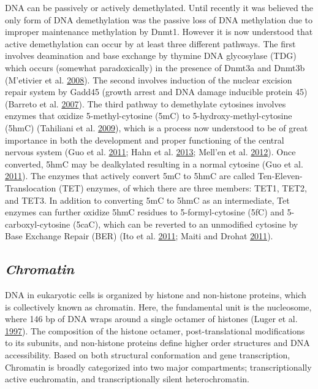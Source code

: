 \documentclass[onehalf,12pt]{beavtex}
\begin{document}
  DNA can be passively or actively demethylated. Until recently it was
  believed the only form of DNA demethylation was the passive loss of DNA
  methylation due to improper maintenance methylation by Dnmt1. However it
  is now understood that active demethylation can occur by at least three
  different pathways. The first involves deamination and base exchange by
  thymine DNA glycosylase (TDG) which occurs (somewhat paradoxically) in
  the presence of Dnmt3a and Dnmt3b (M\a'etivier et al.
  \protect\hyperlink{ref-MetivierCyclicalDNAmethylation2008}{2008}). The
  second involves induction of the nuclear excision repair system by
  Gadd45 (growth arrest and DNA damage inducible protein 45) (Barreto et
  al. \protect\hyperlink{ref-BarretoGadd45apromotesepigenetic2007}{2007}).
  The third pathway to demethylate cytosines involves enzymes that oxidize
  5-methyl-cytosine (5mC) to 5-hydroxy-methyl-cytosine (5hmC) (Tahiliani
  et al.
  \protect\hyperlink{ref-TahilianiConversion5methylcytosine5hydroxymethylcytosine2009}{2009}),
  which is a process now understood to be of great importance in both the
  development and proper functioning of the central nervous system (Guo et
  al.
  \protect\hyperlink{ref-GuoHydroxylation5methylcytosineTET12011}{2011};
  Hahn et al.
  \protect\hyperlink{ref-HahnDynamics5HydroxymethylcytosineChromatin2013}{2013};
  Mell\a'en et al.
  \protect\hyperlink{ref-MellenMeCP2Binds5hmC2012}{2012}). Once converted,
  5hmC may be dealkylated resulting in a normal cytosine (Guo et al.
  \protect\hyperlink{ref-GuoHydroxylation5methylcytosineTET12011}{2011}).
  The enzymes that actively convert 5mC to 5hmC are called
  Ten-Eleven-Translocation (TET) enzymes, of which there are three
  members: TET1, TET2, and TET3. In addition to converting 5mC to 5hmC as
  an intermediate, Tet enzymes can further oxidize 5hmC residues to
  5-formyl-cytosine (5fC) and 5-carboxyl-cytosine (5caC), which can be
  reverted to an unmodified cytosine by Base Exchange Repair (BER) (Ito et
  al. \protect\hyperlink{ref-ItoTetproteinscan2011}{2011}; Maiti and
  Drohat \protect\hyperlink{ref-MaitiThymineDNAglycosylase2011}{2011}).
  
  \subsection*{\texorpdfstring{\emph{Chromatin}}{Chromatin}}\label{chromatin}
  
  DNA in eukaryotic cells is organized by histone and non-histone
  proteins, which is collectively known as chromatin. Here, the
  fundamental unit is the nucleosome, where 146 bp of DNA wraps around a
  single octamer of histones (Luger et al.
  \protect\hyperlink{ref-LugerCrystalstructurenucleosome1997}{1997}). The
  composition of the histone octamer, post-translational modifications to
  its subunits, and non-histone proteins define higher order structures
  and DNA accessibility. Based on both structural conformation and gene
  transcription, Chromatin is broadly categorized into two major
  compartments; transcriptionally active euchromatin, and
  transcriptionally silent heterochromatin.
  
\end{document}
